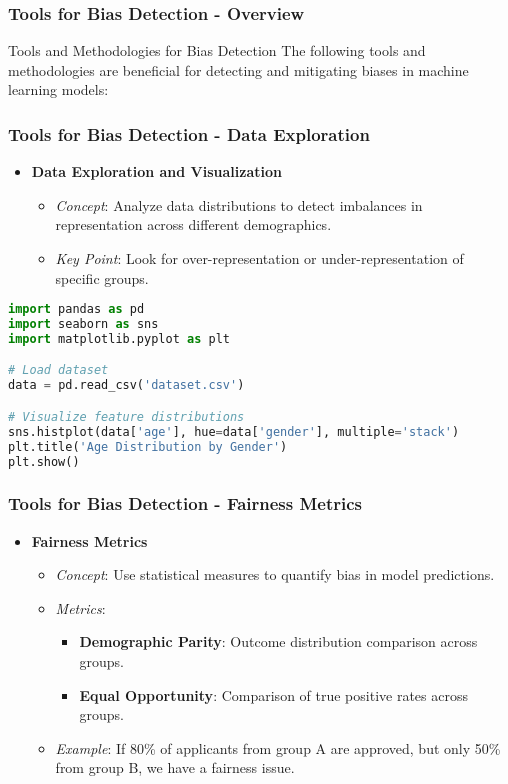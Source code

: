 \documentclass[aspectratio=169]{beamer}
\begin{document}
\begin{frame}[fragile]
    \frametitle{Tools for Bias Detection - Overview}
    \begin{block}{Tools and Methodologies for Bias Detection}
        The following tools and methodologies are beneficial for detecting and mitigating biases in machine learning models:
    \end{block}
\end{frame}

\begin{frame}[fragile]
    \frametitle{Tools for Bias Detection - Data Exploration}
    \begin{itemize}
        \item \textbf{Data Exploration and Visualization}
        \begin{itemize}
            \item \textit{Concept}: Analyze data distributions to detect imbalances in representation across different demographics.
            \item \textit{Key Point}: Look for over-representation or under-representation of specific groups.
        \end{itemize}
    \end{itemize}
    \begin{lstlisting}[language=Python]
import pandas as pd
import seaborn as sns
import matplotlib.pyplot as plt

# Load dataset
data = pd.read_csv('dataset.csv')

# Visualize feature distributions
sns.histplot(data['age'], hue=data['gender'], multiple='stack')
plt.title('Age Distribution by Gender')
plt.show()
    \end{lstlisting}
\end{frame}

\begin{frame}[fragile]
    \frametitle{Tools for Bias Detection - Fairness Metrics}
    \begin{itemize}
        \item \textbf{Fairness Metrics}
        \begin{itemize}
            \item \textit{Concept}: Use statistical measures to quantify bias in model predictions.
            \item \textit{Metrics}:
            \begin{itemize}
                \item \textbf{Demographic Parity}: Outcome distribution comparison across groups.
                \item \textbf{Equal Opportunity}: Comparison of true positive rates across groups.
            \end{itemize}
            \item \textit{Example}: If 80\% of applicants from group A are approved, but only 50\% from group B, we have a fairness issue.
        \end{itemize}
    \end{itemize}
\end{frame}
\end{document}
